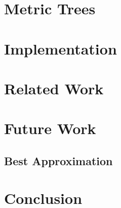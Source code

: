 \documentclass{article}
\begin{document}
\section{Metric Trees}

\section{Implementation}

\section{Related Work}
\section{Future Work}
\subsection{Best Approximation}
\section{Conclusion}



\end{document}
